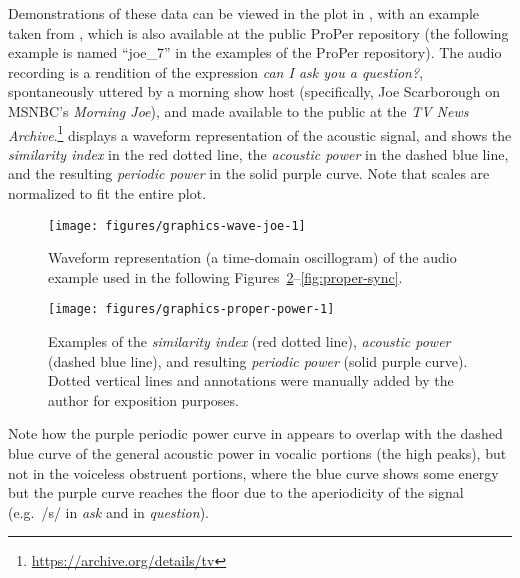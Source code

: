 Demonstrations of these data can be viewed in the plot in , with an example taken from \citet{albert2019cansk}, which is also available at the public ProPer repository (the following example is named \enquote{joe\_7} in the examples of the ProPer repository). The audio recording is a rendition of the expression \emph{can I ask you a question?}, spontaneously uttered by a morning show host (specifically, Joe Scarborough on MSNBC's \emph{Morning Joe}),
and made available to the public at the \emph{TV News Archive}.\footnote{\url{https://archive.org/details/tv}}
 displays a waveform representation of the acoustic signal, and  shows the \emph{similarity index} in the red dotted line, the \emph{acoustic power} in the dashed blue line, and the resulting \emph{periodic power} in the solid purple curve. Note that scales are normalized to fit the entire plot.



\begin{figure}
\texttt{[image: figures/graphics-wave-joe-1]} 
\caption{Waveform representation (a time-domain oscillogram) of the audio example used in the following Figures~\ref{fig:proper-power}–\ref{fig:proper-sync}.}\label{fig:wave-joe}
\end{figure}



\begin{figure}
\texttt{[image: figures/graphics-proper-power-1]} 
\caption{Examples of the \emph{similarity index} (red dotted line), \emph{acoustic power} (dashed blue line), and resulting \emph{periodic power} (solid purple curve). Dotted vertical lines and annotations were manually added by the author for exposition purposes.}\label{fig:proper-power}
\end{figure}

Note how the purple periodic power curve in  appears to overlap with the dashed blue curve of the general acoustic power in vocalic portions (the high peaks), but not in the voiceless obstruent portions, where the blue curve shows some energy but the purple curve reaches the floor due to the aperiodicity of the signal (e.g.~/s/ in \emph{ask} and in \emph{question}).

